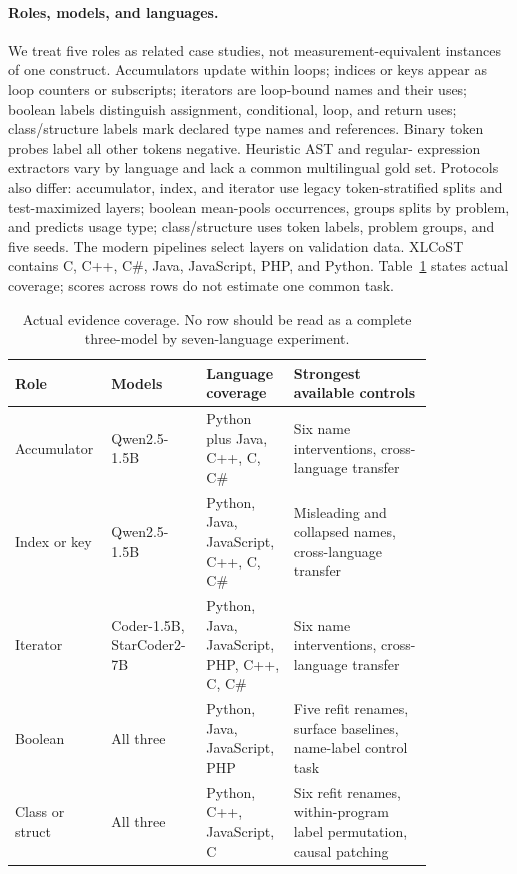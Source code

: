 \documentclass{article}
\begin{document}
\paragraph{Roles, models, and languages.}
We treat five roles as related case studies, not measurement-equivalent
instances of one construct. Accumulators update within loops; indices or keys
appear as loop counters or subscripts; iterators are loop-bound names and their
uses; boolean labels distinguish assignment, conditional, loop, and return
uses; class/structure labels mark declared type names and references. Binary
token probes label all other tokens negative. Heuristic AST and regular-
expression extractors vary by language and lack a common multilingual gold
set. Protocols also differ: accumulator, index, and iterator use legacy
token-stratified splits and test-maximized layers; boolean mean-pools
occurrences, groups splits by problem, and predicts usage type; class/structure
uses token labels, problem groups, and five seeds. The modern pipelines select
layers on validation data. XLCoST contains C, C++, C\#, Java, JavaScript, PHP,
and Python. Table~\ref{tab:scope} states actual coverage; scores across rows do
not estimate one common task.

\begin{table}[t]
\centering
\small
\setlength{\tabcolsep}{3.5pt}
\caption{Actual evidence coverage. No row should be read as a complete
three-model by seven-language experiment.}
\label{tab:scope}
\begin{tabular}{p{0.13\linewidth}p{0.21\linewidth}p{0.18\linewidth}p{0.31\linewidth}}
\toprule
Role & Models & Language coverage & Strongest available controls \\
\midrule
Accumulator & Qwen2.5-1.5B & Python plus Java, C++, C, C\# &
Six name interventions, cross-language transfer \\
Index or key & Qwen2.5-1.5B & Python, Java, JavaScript, C++, C, C\# &
Misleading and collapsed names, cross-language transfer \\
Iterator & Coder-1.5B, StarCoder2-7B &
Python, Java, JavaScript, PHP, C++, C, C\# &
Six name interventions, cross-language transfer \\
Boolean & All three & Python, Java, JavaScript, PHP &
Five refit renames, surface baselines, name-label control task \\
Class or struct & All three & Python, C++, JavaScript, C &
Six refit renames, within-program label permutation, causal patching \\
\bottomrule
\end{tabular}
\end{table}
\end{document}
